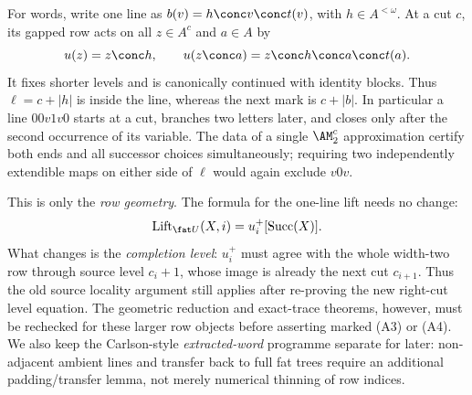 For words, write one line as $b(v)=h\conc v\conc t(v)$, with
$h\in A^{<\omega}$. At a cut $c$, its gapped row acts on all
$z\in A^c$ and $a\in A$ by
$$
 u(z)=z\conc h,\qquad
 u(z\conc a)=z\conc h\conc a\conc t(a).
$$
It fixes shorter levels and is canonically continued with identity
blocks. Thus $\ell=c+|h|$ is inside the line, whereas the next
mark is $c+|b|$. In particular a line $00v1v0$ starts at a
cut, branches two letters later, and closes only after the second
occurrence of its variable. The data of a single
$\AM^{c}_2$ approximation certify both ends and all successor
choices simultaneously; requiring two independently extendible
maps on either side of $\ell$ would again exclude $v0v$.

This is only the \emph{row geometry}. The formula for the
one-line lift needs no change:
$$
 \operatorname{Lift}_{\fat U}(X,i)
   =u_i^+[\operatorname{Succ}(X)].
$$
What changes is the \emph{completion level}: $u_i^+$ must agree
with the whole width-two row through source level $c_i+1$, whose
image is already the next cut $c_{i+1}$. Thus the old source
locality argument still applies after re-proving the new right-cut
level equation. The geometric reduction and exact-trace theorems,
however, must be rechecked for these larger row objects before
asserting marked (A3) or (A4). We also keep the
Carlson-style \emph{extracted-word} programme separate for later:
non-adjacent ambient lines and transfer back to full fat trees
require an additional padding/transfer lemma, not merely numerical
thinning of row indices.
